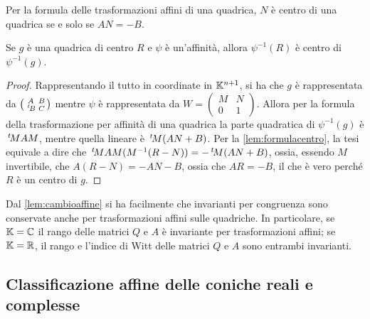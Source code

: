 \begin{remark}\label{lem:formulacentro}
 Per la formula delle trasformazioni affini di una quadrica, $N$ è centro di una quadrica se e solo se $AN=-B$.
\end{remark}
	
 \begin{lemma}\label{lem:centroaff}
  Se $g$ è una quadrica di centro $R$ e $\psi$ è un'affinità, allora $\psi^{-1}(R)$ è centro di $\psi^{-1}(g)$.
 \end{lemma}
 
 \begin{proof}
	Rappresentando il tutto in coordinate in $\mathbb K^{n+1}$, si ha che $g$ è rappresentata da $\left(\begin{smallmatrix}A & B \\ \, ^{t}\!B & C
	\end{smallmatrix} \right)$ mentre $\psi$ è rappresentata da $W=\left(\begin{smallmatrix} M & N \\ 0 & 1 \end{smallmatrix} \right)$.
	Allora per la formula della trasformazione per affinità di una quadrica la parte quadratica di $\psi^{-1}(g)$ è $\, ^{t}\!MAM$, mentre quella
	lineare è $\, ^{t}\!M(AN+B)$.
	Per la \cref{lem:formulacentro}, la tesi equivale a dire che $\, ^{t}\!MAM(M^{-1}(R-N))=-\, ^{t}\!M(AN+B)$, ossia, essendo $M$ invertibile,
	che $A(R-N)=-AN-B$, ossia che $AR=-B$, il che è vero perché $R$ è un centro di $g$.
 \end{proof}
 
 \begin{remark}\label{oss:invarianti}
	Dal \cref{lem:cambioaffine} si ha facilmente che invarianti per congruenza sono conservate anche per trasformazioni affini sulle quadriche.
	In particolare, se $\mathbb K = \mathbb C$ il rango delle matrici $Q$ e $A$ è invariante per trasformazioni affini;
	se $\mathbb K= \mathbb R$, il rango e l'indice di Witt delle matrici $Q$ e $A$ sono entrambi invarianti.
\end{remark}

\subsection{Classificazione affine delle coniche reali e complesse}

